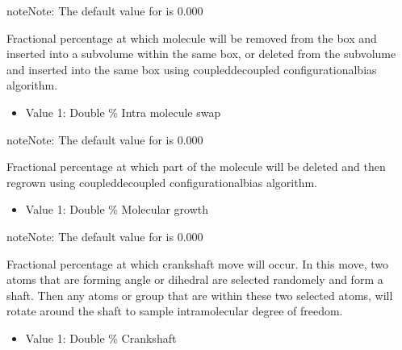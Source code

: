 \documentclass[letterpaper,10pt,english]{sphinxmanual}
\begin{document}
\begin{description}
\begin{sphinxadmonition}{note}{Note:}
\sphinxAtStartPar
The default value for  is 0.000
\end{sphinxadmonition}

\item[{\sphinxcode{\sphinxupquote{IntraTargetedSwapFreq}}}] \leavevmode
\sphinxAtStartPar
Fractional percentage at which molecule will be removed from the box and inserted into a subvolume within the same box, or deleted from the subvolume and inserted into the same box using coupled\sphinxhyphen{}decoupled configurational\sphinxhyphen{}bias algorithm.
\begin{itemize}
\item {} 
\sphinxAtStartPar
Value 1: Double \sphinxhyphen{} \% Intra molecule swap

\end{itemize}

\begin{sphinxadmonition}{note}{Note:}
\sphinxAtStartPar
The default value for  is 0.000
\end{sphinxadmonition}

\item[{\sphinxcode{\sphinxupquote{RegrowthFreq}}}] \leavevmode
\sphinxAtStartPar
Fractional percentage at which part of the molecule will be deleted and then regrown using coupled\sphinxhyphen{}decoupled configurational\sphinxhyphen{}bias algorithm.
\begin{itemize}
\item {} 
\sphinxAtStartPar
Value 1: Double \sphinxhyphen{} \% Molecular growth

\end{itemize}

\begin{sphinxadmonition}{note}{Note:}
\sphinxAtStartPar
The default value for  is 0.000
\end{sphinxadmonition}

\item[{\sphinxcode{\sphinxupquote{CrankShaftFreq}}}] \leavevmode
\sphinxAtStartPar
Fractional percentage at which crankshaft move will occur. In this move, two atoms that are forming angle or dihedral are selected randomely and form a shaft.
Then any atoms or group that are within these two selected atoms, will rotate around the shaft to sample intramolecular degree of freedom.
\begin{itemize}
\item {} 
\sphinxAtStartPar
Value 1: Double \sphinxhyphen{} \% Crankshaft


\end{itemize}
\end{description}
\end{document}
